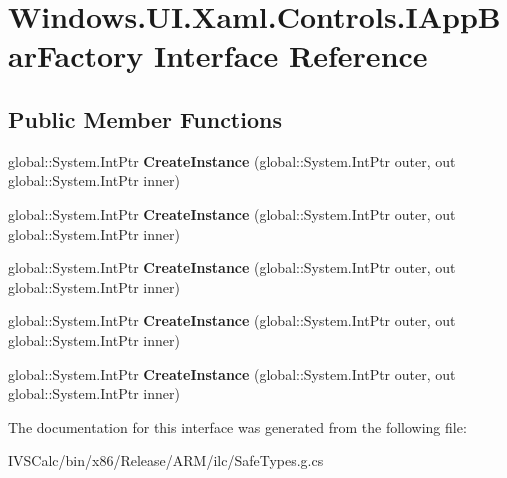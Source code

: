 \hypertarget{interface_windows_1_1_u_i_1_1_xaml_1_1_controls_1_1_i_app_bar_factory}{}\section{Windows.\+U\+I.\+Xaml.\+Controls.\+I\+App\+Bar\+Factory Interface Reference}
\label{interface_windows_1_1_u_i_1_1_xaml_1_1_controls_1_1_i_app_bar_factory}
\subsection*{Public Member Functions}
\begin{DoxyCompactItemize}
\item 
\mbox{\label{interface_windows_1_1_u_i_1_1_xaml_1_1_controls_1_1_i_app_bar_factory_ac4d87fca361db98d853e2c9857da87df}} 
global\+::\+System.\+Int\+Ptr {\bfseries Create\+Instance} (global\+::\+System.\+Int\+Ptr outer, out global\+::\+System.\+Int\+Ptr inner)
\item 
\mbox{\label{interface_windows_1_1_u_i_1_1_xaml_1_1_controls_1_1_i_app_bar_factory_ac4d87fca361db98d853e2c9857da87df}} 
global\+::\+System.\+Int\+Ptr {\bfseries Create\+Instance} (global\+::\+System.\+Int\+Ptr outer, out global\+::\+System.\+Int\+Ptr inner)
\item 
\mbox{\label{interface_windows_1_1_u_i_1_1_xaml_1_1_controls_1_1_i_app_bar_factory_ac4d87fca361db98d853e2c9857da87df}} 
global\+::\+System.\+Int\+Ptr {\bfseries Create\+Instance} (global\+::\+System.\+Int\+Ptr outer, out global\+::\+System.\+Int\+Ptr inner)
\item 
\mbox{\label{interface_windows_1_1_u_i_1_1_xaml_1_1_controls_1_1_i_app_bar_factory_ac4d87fca361db98d853e2c9857da87df}} 
global\+::\+System.\+Int\+Ptr {\bfseries Create\+Instance} (global\+::\+System.\+Int\+Ptr outer, out global\+::\+System.\+Int\+Ptr inner)
\item 
\mbox{\label{interface_windows_1_1_u_i_1_1_xaml_1_1_controls_1_1_i_app_bar_factory_ac4d87fca361db98d853e2c9857da87df}} 
global\+::\+System.\+Int\+Ptr {\bfseries Create\+Instance} (global\+::\+System.\+Int\+Ptr outer, out global\+::\+System.\+Int\+Ptr inner)
\end{DoxyCompactItemize}


The documentation for this interface was generated from the following file\+:\begin{DoxyCompactItemize}
\item 
I\+V\+S\+Calc/bin/x86/\+Release/\+A\+R\+M/ilc/Safe\+Types.\+g.\+cs\end{DoxyCompactItemize}
